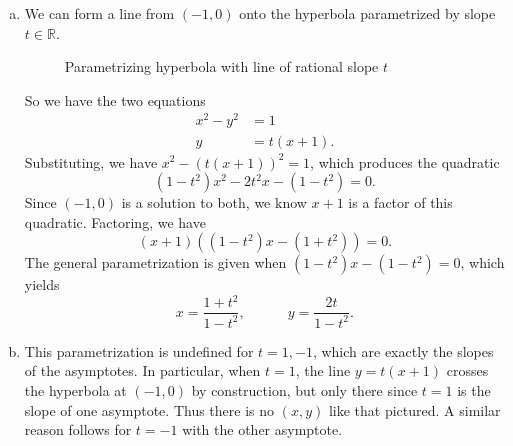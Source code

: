 \documentclass{homework}
\begin{document}
\begin{enumerate}[(a)]
        \item We can form a line from $(-1, 0)$ onto the hyperbola parametrized by slope $t \in \mathbb R$.
        \begin{figure}[h!]
            \centering
            \caption{Parametrizing hyperbola with line of rational slope $t$}
        \end{figure}
        So we have the two equations
        \begin{align*}
            x^2 - y^2 &= 1 \\
            y &= t(x+1).
        \end{align*}
        Substituting, we have $x^2 - (t(x+1))^2 = 1$, which produces the quadratic
        \[(1-t^2)x^2 - 2t^2x - (1 - t^2) = 0.\]
        Since $(-1, 0)$ is a solution to both, we know $x+1$ is a factor of this quadratic. Factoring, we have
        \[(x+1)((1-t^2)x - (1+t^2)) = 0.\]
        The general parametrization is given when $(1-t^2)x - (1-t^2) = 0$, which yields
        \[x = \frac{1+t^2}{1-t^2}, \quad\quad\quad y = \frac{2t}{1-t^2}.\]
        
        \item This parametrization is undefined for $t = 1, -1$, which are exactly the slopes of the asymptotes. In particular, when $t = 1$, the line $y = t(x+1)$ crosses the hyperbola at $(-1, 0)$ by construction, but only there since $t = 1$ is the slope of one asymptote. Thus there is no $(x, y)$ like that pictured. A similar reason follows for $t = -1$ with the other asymptote.
    \end{enumerate}
    
\end{document}
